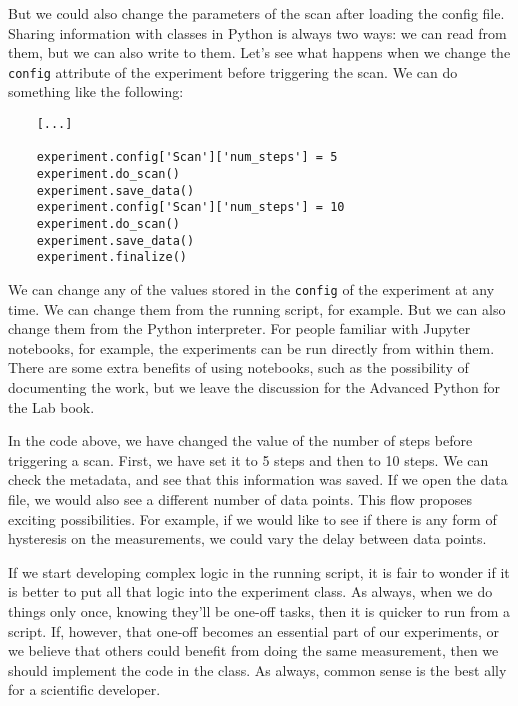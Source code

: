 But we could also change the parameters of the scan after loading the config file. Sharing information with classes in Python is always two ways: we can read from them, but we can also write to them. Let's see what happens when we change the \texttt{config} attribute of the experiment before triggering the scan. We can do something like the following:

\begin{verbatim}
    [...]

    experiment.config['Scan']['num_steps'] = 5
    experiment.do_scan()
    experiment.save_data()
    experiment.config['Scan']['num_steps'] = 10
    experiment.do_scan()
    experiment.save_data()
    experiment.finalize()
\end{verbatim}

We can change any of the values stored in the \texttt{config} of the experiment at any time. We can change them from the running script, for example. But we can also change them from the Python interpreter. For people familiar with Jupyter notebooks, for example, the experiments can be run directly from within them. There are some extra benefits of using notebooks, such as the possibility of documenting the work, but we leave the discussion for the Advanced Python for the Lab book.


In the code above, we have changed the value of the number of steps before triggering a scan. First, we have set it to 5 steps and then to 10 steps. We can check the metadata, and see that this information was saved. If we open the data file, we would also see a different number of data points. This flow proposes exciting possibilities. For example, if we would like to see if there is any form of hysteresis on the measurements, we could vary the delay between data points.


If we start developing complex logic in the running script, it is fair to wonder if it is better to put all that logic into the experiment class. As always, when we do things only once, knowing they'll be one-off tasks, then it is quicker to run from a script. If, however, that one-off becomes an essential part of our experiments, or we believe that others could benefit from doing the same measurement, then we should implement the code in the class. As always, common sense is the best ally for a scientific developer.

